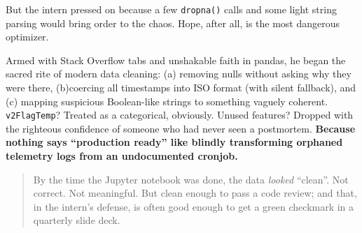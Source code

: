 But the intern pressed on because a few \texttt{dropna()} calls and some light string parsing would bring order to the chaos.  Hope, after all, is the most dangerous optimizer.

Armed with Stack Overflow tabs and unshakable faith in pandas, he began the sacred rite of modern data cleaning: (a) removing nulls without asking why they were there, (b)coercing all timestamps into ISO format (with silent fallback), and (c) mapping suspicious Boolean-like strings to something vaguely coherent. \texttt{v2FlagTemp}? Treated as a categorical, obviously.  Unused features? Dropped with the righteous confidence of someone who had never seen a postmortem.  \textbf{Because nothing says “production ready” like blindly transforming orphaned telemetry logs from an undocumented cronjob.}

\begin{quote}
By the time the Jupyter notebook was done, the data \textit{looked} ``clean''.  Not correct. Not meaningful. But clean enough to pass a code review; and that, in the intern’s defense, is often good enough to get a green checkmark in a quarterly slide deck.
\end{quote}


